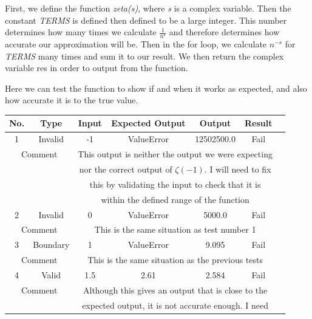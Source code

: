 \documentclass{article}
\begin{document}
First, we define the function \textit{zeta(s)}, where \textit{s} is a complex variable. Then the constant \textit{TERMS} is defined then defined to be a large integer. This number determines how many times we calculate $\frac{1}{n^s}$ and therefore determines how accurate our approximation will be. Then in the for loop, we calculate $n^{-s}$ for \textit{TERMS} many times and sum it to our result. We then return the complex variable res in order to output from the function.

Here we can test the function to show if and when it works as expected, and also how accurate it is to the true value.
\\
\begin{table}[ht]
    \centering
    \begin{tabular}{|c|c|c|c|c|c|c|}
    \hline
    \textbf{No.} & \textbf{Type} & \textbf{Input} & \textbf{Expected Output} & \textbf{Output} & \textbf{Result}\\
    \hline
    \hline
    1 & Invalid & -1 & ValueError & 12502500.0 & Fail\\
    \hline
    \multicolumn{2}{|c|}{Comment} & \multicolumn{4}{|c|}{This output is neither the output we were expecting}\\
    \multicolumn{2}{|c|}{} & \multicolumn{4}{|c|}{nor the correct output of $\zeta(-1)$. I will need to fix}\\
    \multicolumn{2}{|c|}{} & \multicolumn{4}{|c|}{this by validating the input to check that it is}\\
    \multicolumn{2}{|c|}{} & \multicolumn{4}{|c|}{within the defined range of the function}\\
    \hline
    \hline
    2 & Invalid & 0 & ValueError & 5000.0 & Fail\\
    \hline
    \multicolumn{2}{|c|}{Comment} & \multicolumn{4}{|c|}{This is the same situation as test number 1}\\
    \hline
    \hline
    3 & Boundary & 1 & ValueError & 9.095 & Fail\\
    \hline
    \multicolumn{2}{|c|}{Comment} & \multicolumn{4}{|c|}{This is the same situation as the previous tests}\\
    \hline
    \hline
    4 & Valid & 1.5 & 2.61 & 2.584 & Fail\\
    \hline
    \multicolumn{2}{|c|}{Comment} & \multicolumn{4}{|c|}{Although this gives an output that is close to the}\\
    \multicolumn{2}{|c|}{} & \multicolumn{4}{|c|}{expected output, it is not accurate enough. I need}\\

\end{tabular}
\end{table}
\end{document}
